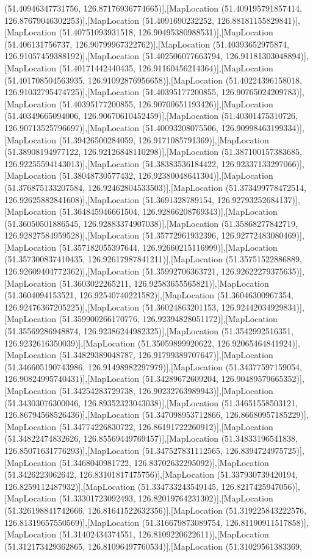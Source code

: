 (51.40946347731756, 126.87176936774665)],[MapLocation (51.409195791857414, 126.87679046302253)],[MapLocation (51.4091690232252, 126.88181155829841)],[MapLocation (51.40751093931518, 126.90495380988531)],[MapLocation (51.406131756737, 126.90799967322762)],[MapLocation (51.40393652975874, 126.91057459388192)],[MapLocation (51.402506077663794, 126.91181303048894)],[MapLocation (51.40171442440435, 126.91160456214364)],[MapLocation (51.401708504563935, 126.91092876956658)],[MapLocation (51.40224396158018, 126.91032795474725)],[MapLocation (51.40395177200855, 126.90765024209783)],[MapLocation (51.40395177200855, 126.90700651193426)],[MapLocation (51.40349665094006, 126.90670610452459)],[MapLocation (51.40301475310726, 126.90713525796697)],[MapLocation (51.40093208075506, 126.90998463199334)],[MapLocation (51.39426500284059, 126.9171085791369)],[MapLocation (51.38908194977122, 126.92126848110298)],[MapLocation (51.387100157383685, 126.92255594143013)],[MapLocation (51.38383536184422, 126.92337133297066)],[MapLocation (51.38048730577432, 126.92380048641304)],[MapLocation (51.376875133207584, 126.92462804533503)],[MapLocation (51.373499778472514, 126.92625882841608)],[MapLocation (51.3691328789154, 126.92793252684137)],[MapLocation (51.364845946661504, 126.92866208769343)],[MapLocation (51.36050501886545, 126.92883374907038)],[MapLocation (51.35868277842719, 126.92827584959528)],[MapLocation (51.35772961932396, 126.92772483080469)],[MapLocation (51.357182055397644, 126.92660215116999)],[MapLocation (51.357300837410435, 126.92617987841211)],[MapLocation (51.35751522886889, 126.92609404772362)],[MapLocation (51.35992706363721, 126.92622279375635)],[MapLocation (51.3603022265211, 126.92583655565821)],[MapLocation (51.3604094153521, 126.92540740221582)],[MapLocation (51.36046300967354, 126.92476367205225)],[MapLocation (51.36024863201153, 126.92442034929834)],[MapLocation (51.359900266170776, 126.92394828051172)],[MapLocation (51.35569286948874, 126.92386244982325)],[MapLocation (51.3542992516351, 126.9232616350039)],[MapLocation (51.35059899920622, 126.92065464841924)],[MapLocation (51.34829389048787, 126.91799389707647)],[MapLocation (51.346605190743986, 126.91498982297979)],[MapLocation (51.34377597159054, 126.90824995740431)],[MapLocation (51.34289672609204, 126.90489579665352)],[MapLocation (51.34254283729738, 126.90232763989943)],[MapLocation (51.34303076300046, 126.89352323043038)],[MapLocation (51.34651558503121, 126.86794568526436)],[MapLocation (51.347098953712866, 126.86680957185229)],[MapLocation (51.34774226830722, 126.86191722260912)],[MapLocation (51.34822474832626, 126.85569449769457)],[MapLocation (51.34833196541838, 126.85071631776293)],[MapLocation (51.347527831112565, 126.8394724975725)],[MapLocation (51.3468040981722, 126.83702632295092)],[MapLocation (51.3426223062642, 126.83101817475756)],[MapLocation (51.337930739420194, 126.8259112487932)],[MapLocation (51.334733243549145, 126.8217425947056)],[MapLocation (51.33301723092493, 126.82019764231302)],[MapLocation (51.326198841742666, 126.81641522632356)],[MapLocation (51.319225843222576, 126.81319657550569)],[MapLocation (51.316679873089754, 126.81190911517858)],[MapLocation (51.31402434374551, 126.8109220622611)],[MapLocation (51.312173429362865, 126.81096497760534)],[MapLocation (51.31029561383369, 